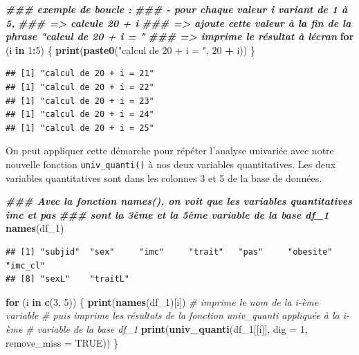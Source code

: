 \documentclass[
]{book}
\newenvironment{Shaded}{\begin{snugshade}}{\end{snugshade}}
\newcommand{\AttributeTok}[1]{\textcolor[rgb]{0.13,0.29,0.53}{#1}}
\newcommand{\CommentTok}[1]{\textcolor[rgb]{0.56,0.35,0.01}{\textit{#1}}}
\newcommand{\ConstantTok}[1]{\textcolor[rgb]{0.56,0.35,0.01}{#1}}
\newcommand{\ControlFlowTok}[1]{\textcolor[rgb]{0.13,0.29,0.53}{\textbf{#1}}}
\newcommand{\DecValTok}[1]{\textcolor[rgb]{0.00,0.00,0.81}{#1}}
\newcommand{\DocumentationTok}[1]{\textcolor[rgb]{0.56,0.35,0.01}{\textbf{\textit{#1}}}}
\newcommand{\FunctionTok}[1]{\textcolor[rgb]{0.13,0.29,0.53}{\textbf{#1}}}
\newcommand{\NormalTok}[1]{#1}
\newcommand{\SpecialCharTok}[1]{\textcolor[rgb]{0.81,0.36,0.00}{\textbf{#1}}}
\newcommand{\StringTok}[1]{\textcolor[rgb]{0.31,0.60,0.02}{#1}}
\begin{document}
\begin{Shaded}
\begin{Highlighting}[]
\DocumentationTok{\#\#\# exemple de boucle : }
\DocumentationTok{\#\#\#  {-} pour chaque valeur i variant de 1 à 5,}
\DocumentationTok{\#\#\#    =\textgreater{} calcule 20 + i}
\DocumentationTok{\#\#\#    =\textgreater{} ajoute cette valeur à la fin de la phrase "calcul de 20 + i = "}
\DocumentationTok{\#\#\#    =\textgreater{} imprime le résultat à l\textquotesingle{}écran}
\ControlFlowTok{for}\NormalTok{ (i }\ControlFlowTok{in} \DecValTok{1}\SpecialCharTok{:}\DecValTok{5}\NormalTok{) \{}
  \FunctionTok{print}\NormalTok{(}\FunctionTok{paste0}\NormalTok{(}\StringTok{"calcul de 20 + i = "}\NormalTok{, }\DecValTok{20} \SpecialCharTok{+}\NormalTok{ i))}
\NormalTok{\}}
\end{Highlighting}
\end{Shaded}

\begin{verbatim}
## [1] "calcul de 20 + i = 21"
## [1] "calcul de 20 + i = 22"
## [1] "calcul de 20 + i = 23"
## [1] "calcul de 20 + i = 24"
## [1] "calcul de 20 + i = 25"
\end{verbatim}

On peut appliquer cette démarche pour répéter l'analyse univariée avec notre nouvelle fonction \texttt{univ\_quanti()} à nos deux variables quantitatives. Les deux variables quantitatives sont dans les colonnes 3 et 5 de la base de données.

\begin{Shaded}
\begin{Highlighting}[]
\DocumentationTok{\#\#\# Avec la fonction names(), on voit que les variables quantitatives imc et pas }
\DocumentationTok{\#\#\# sont la 3ème et la 5ème variable de la base df\_1}
\FunctionTok{names}\NormalTok{(df\_1)}
\end{Highlighting}
\end{Shaded}

\begin{verbatim}
## [1] "subjid"  "sex"     "imc"     "trait"   "pas"     "obesite" "imc_cl" 
## [8] "sexL"    "traitL"
\end{verbatim}

\begin{Shaded}
\begin{Highlighting}[]
\ControlFlowTok{for}\NormalTok{ (i }\ControlFlowTok{in} \FunctionTok{c}\NormalTok{(}\DecValTok{3}\NormalTok{, }\DecValTok{5}\NormalTok{)) \{}
  \FunctionTok{print}\NormalTok{(}\FunctionTok{names}\NormalTok{(df\_1)[i]) }\CommentTok{\# imprime le nom de la i{-}ème variable}
  \CommentTok{\# puis imprime les résultats de la fonction univ\_quanti appliquée à la i{-}ème}
  \CommentTok{\# variable de la base df\_1}
  \FunctionTok{print}\NormalTok{(}\FunctionTok{univ\_quanti}\NormalTok{(df\_1[[i]], }\AttributeTok{dig =} \DecValTok{1}\NormalTok{, }\AttributeTok{remove\_miss =} \ConstantTok{TRUE}\NormalTok{)) }
\NormalTok{\}}
\end{Highlighting}
\end{Shaded}
\end{document}
